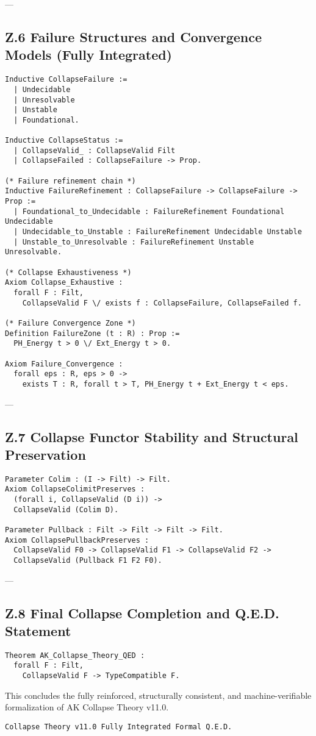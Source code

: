 \documentclass[11pt]{article}
\begin{document}
---

\subsection*{Z.6 Failure Structures and Convergence Models (Fully Integrated)}

\begin{lstlisting}[language=Coq]
Inductive CollapseFailure :=
  | Undecidable
  | Unresolvable
  | Unstable
  | Foundational.

Inductive CollapseStatus :=
  | CollapseValid_ : CollapseValid Filt
  | CollapseFailed : CollapseFailure -> Prop.

(* Failure refinement chain *)
Inductive FailureRefinement : CollapseFailure -> CollapseFailure -> Prop :=
  | Foundational_to_Undecidable : FailureRefinement Foundational Undecidable
  | Undecidable_to_Unstable : FailureRefinement Undecidable Unstable
  | Unstable_to_Unresolvable : FailureRefinement Unstable Unresolvable.

(* Collapse Exhaustiveness *)
Axiom Collapse_Exhaustive :
  forall F : Filt,
    CollapseValid F \/ exists f : CollapseFailure, CollapseFailed f.

(* Failure Convergence Zone *)
Definition FailureZone (t : R) : Prop :=
  PH_Energy t > 0 \/ Ext_Energy t > 0.

Axiom Failure_Convergence :
  forall eps : R, eps > 0 ->
    exists T : R, forall t > T, PH_Energy t + Ext_Energy t < eps.
\end{lstlisting}

---

\subsection*{Z.7 Collapse Functor Stability and Structural Preservation}

\begin{lstlisting}[language=Coq]
Parameter Colim : (I -> Filt) -> Filt.
Axiom CollapseColimitPreserves :
  (forall i, CollapseValid (D i)) ->
  CollapseValid (Colim D).

Parameter Pullback : Filt -> Filt -> Filt -> Filt.
Axiom CollapsePullbackPreserves :
  CollapseValid F0 -> CollapseValid F1 -> CollapseValid F2 ->
  CollapseValid (Pullback F1 F2 F0).
\end{lstlisting}

---

\subsection*{Z.8 Final Collapse Completion and Q.E.D. Statement}

\begin{lstlisting}[language=Coq]
Theorem AK_Collapse_Theory_QED :
  forall F : Filt,
    CollapseValid F -> TypeCompatible F.
\end{lstlisting}

This concludes the fully reinforced, structurally consistent, and machine-verifiable formalization of AK Collapse Theory v11.0.

\begin{flushright}
\texttt{Collapse Theory v11.0 \quad Fully Integrated \quad Formal Q.E.D.}
\end{flushright}
\end{document}
